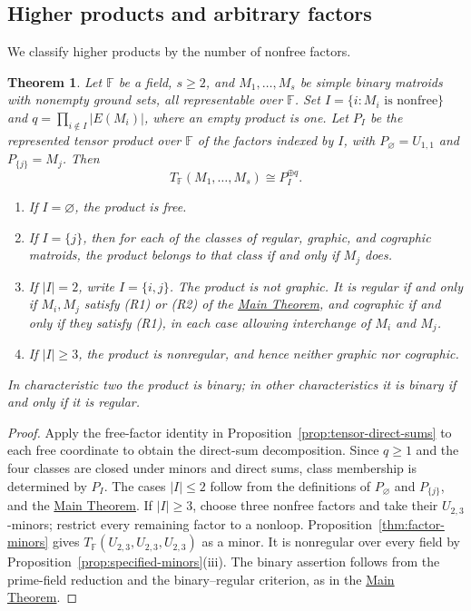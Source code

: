 \documentclass[12pt,a4paper]{article}
\numberwithin{equation}{section}
\newcommand{\F}{\mathbb F}
\newtheorem{theorem}{Theorem}[section]
\newcommand{\mainthm}{\hyperref[thm:regular-two-factor]{Main Theorem}}
\theoremstyle{definition}
\theoremstyle{remark}
\begin{document}
\subsection{Higher products and arbitrary factors}\label{subsec:higher-products}
We classify higher products by the number of nonfree factors.
\begin{theorem}\label{thm:regular-higher}
Let \(\F\) be a field, \(s\ge2\), and \(M_1,\ldots,M_s\) be simple
binary matroids with nonempty ground sets, all representable over \(\F\).  Set \(I=\{i:M_i\text{ is nonfree}\}\) and
\(q=\prod_{i\notin I}|E(M_i)|\), where an empty product is one.
Let \(P_I\) be the represented tensor product over \(\F\) of the factors indexed by \(I\),
with \(P_\varnothing=U_{1,1}\) and \(P_{\{j\}}=M_j\).  Then
\[
 T_{\F}(M_1,\ldots,M_s)\cong P_I^{\oplus q}.
\]
\begin{enumerate}[label=\textup{(\roman*)},leftmargin=2.5em,itemsep=0pt,parsep=0pt,topsep=3pt]
\item If \(I=\varnothing\), the product is free.
\item If \(I=\{j\}\), then for each of the classes of regular,
graphic, and cographic matroids, the product belongs to that class
if and only if \(M_j\) does.
\item If \(|I|=2\), write \(I=\{i,j\}\).  The product is not graphic.  It is
regular if and only if \(M_i,M_j\) satisfy \textup{(R1)} or
\textup{(R2)} of the \mainthm{}, and cographic if and only if
they satisfy \textup{(R1)}, in each case allowing interchange
of \(M_i\) and \(M_j\).
\item If \(|I|\ge3\), the product is nonregular, and hence
neither graphic nor cographic.
\end{enumerate}
In characteristic two the product is binary; in other
characteristics it is binary if and only if it is regular.
\end{theorem}
\begin{proof}
Apply the free-factor identity in
Proposition~\ref{prop:tensor-direct-sums} to each free coordinate
to obtain the direct-sum decomposition.  Since \(q\ge1\) and
the four classes are closed under minors and direct sums,
class membership is determined by \(P_I\).
The cases \(|I|\le2\) follow from
the definitions of \(P_\varnothing\) and \(P_{\{j\}}\), and the \mainthm{}.
If \(|I|\ge3\), choose three nonfree factors and take their
\(U_{2,3}\)-minors; restrict every remaining factor to a nonloop.
Proposition~\ref{thm:factor-minors} gives
\(T_{\F}(U_{2,3},U_{2,3},U_{2,3})\) as a minor.  It is nonregular
over every field by Proposition~\ref{prop:specified-minors}\textup{(iii)}.
The binary assertion follows from the prime-field reduction and the
binary--regular criterion, as in the \mainthm{}.
\end{proof}
\end{document}
